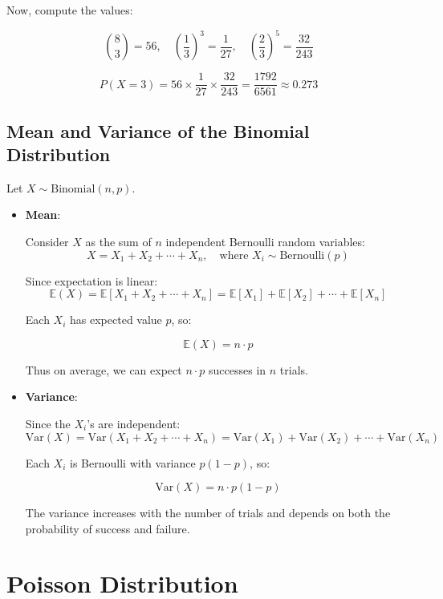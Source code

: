 \documentclass[twoside]{book}
\begin{document}
Now, compute the values:

\[
\binom{8}{3} = 56, \quad \left( \frac{1}{3} \right)^3 = \frac{1}{27}, \quad \left( \frac{2}{3} \right)^5 = \frac{32}{243}
\]

\[
P(X = 3) = 56 \times \frac{1}{27} \times \frac{32}{243} = \frac{1792}{6561} \approx 0.273
\]

\subsection{Mean and Variance of the Binomial Distribution}

Let $X \sim \text{Binomial}(n, p)$.

\begin{itemize}
    \item \textbf{Mean}:

    Consider $X$ as the sum of $n$ independent Bernoulli random variables:
    \[
    X = X_1 + X_2 + \cdots + X_n, \quad \text{where } X_i \sim \text{Bernoulli}(p)
    \]

    Since expectation is linear:
    \[
    \mathbb{E}(X) = \mathbb{E}[X_1 + X_2 + \cdots + X_n] = \mathbb{E}[X_1] + \mathbb{E}[X_2] + \cdots + \mathbb{E}[X_n]
    \]

    Each $X_i$ has expected value $p$, so:
    \begin{textbox}
        \[
    \mathbb{E}(X) = n \cdot p
    \]
    \end{textbox}

    Thus on average, we can expect $n \cdot p$ successes in $n$ trials.

    \item \textbf{Variance}:

    Since the $X_i$'s are independent:
    \[
    \text{Var}(X) = \text{Var}(X_1 + X_2 + \cdots + X_n) = \text{Var}(X_1) + \text{Var}(X_2) + \cdots + \text{Var}(X_n)
    \]

    Each $X_i$ is Bernoulli with variance $p(1 - p)$, so:
    \begin{textbox}
        \[
    \text{Var}(X) = n \cdot p(1 - p)
    \]
    \end{textbox}

    The variance increases with the number of trials and depends on both the probability of success and failure.
\end{itemize}

\section{Poisson Distribution}
\end{document}
